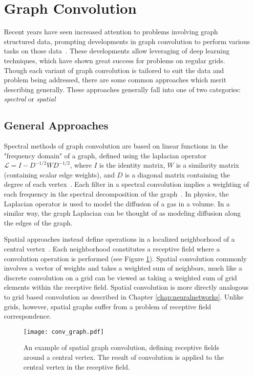 \section{Graph Convolution}
Recent years have seen increased attention to problems involving graph structured data, prompting developments in graph convolution to perform various tasks on those data~\cite{bronstein2016}.
These developments allow leveraging of deep learning techniques, which have shown great success for problems on regular grids.
Though each variant of graph convolution is tailored to suit the data and problem being addressed, there are some common approaches which merit describing generally.
These approaches generally fall into one of two categories: \emph{spectral} or \emph{spatial}


\subsection{General Approaches}
Spectral methods of graph convolution are based on linear functions in the "frequency domain" of a graph, defined using the laplacian operator $\mathcal{L}=I-D^{-1/2}WD^{-1/2}$, where $I$ is the identity matrix, $W$ is a similarity matrix (containing scalar edge weights), and $D$ is a diagonal matrix containing the degree of each vertex~\cite{bruna2013, henaff2015, kipf2016}.
Each filter in a spectral convolution implies a weighting of each frequency in the spectral decomposition of the graph~\cite{mallat2009}.
In physics, the Laplacian operator is used to model the diffusion of a gas in a volume.
In a similar way, the graph Laplacian can be thought of as modeling diffusion along the edges of the graph.

Spatial approaches instead define operations in a localized neighborhood of a central vertex~\cite{henaff2015, atwood2016}.
Each neighborhood constitutes a receptive field where a convolution operation is performed (see Figure \ref{fig:spatial_graph_conv}).
Spatial convolution commonly involves a vector of weights and takes a weighted sum of neighbors, much like a discrete convolution on a grid can be viewed as taking a weighted sum of grid elements within the receptive field.
Spatial convolution is more directly analogous to grid based convolution as described in Chapter \ref{chap:neuralnetworks}.
Unlike grids, however, spatial graphs suffer from a problem of receptive field correspondence.

\begin{figure}
	\centering
	\texttt{[image: conv\_graph.pdf]}
	\caption{An example of spatial graph convolution, defining receptive fields around a central vertex. The result of convolution is applied to the central vertex in the receptive field.}
	\label{fig:spatial_graph_conv}
\end{figure}

